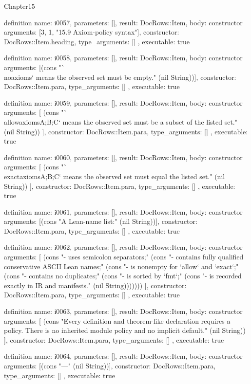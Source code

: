 \begin{lexlean}{Chapter15}
\begin{semanticmodule}
definition{
  name: i0057,
  parameters: [],
  result: DocRows::Item,
  body: constructor{
    arguments: [3, 1, "15.9 Axiom-policy syntax"],
    constructor: DocRows::Item.heading,
    type_arguments: []
  },
  executable: true
}

definition{
  name: i0058,
  parameters: [],
  result: DocRows::Item,
  body: constructor{
    arguments: [(cons "`\\noaxioms` means the observed set must be empty." (nil String))],
    constructor: DocRows::Item.para,
    type_arguments: []
  },
  executable: true
}

definition{
  name: i0059,
  parameters: [],
  result: DocRows::Item,
  body: constructor{
    arguments: [
      (cons "`\\allowaxioms{A;B;C}` means the observed set must be a subset of the listed set." (nil String))
    ],
    constructor: DocRows::Item.para,
    type_arguments: []
  },
  executable: true
}

definition{
  name: i0060,
  parameters: [],
  result: DocRows::Item,
  body: constructor{
    arguments: [
      (cons "`\\exactaxioms{A;B;C}` means the observed set must equal the listed set." (nil String))
    ],
    constructor: DocRows::Item.para,
    type_arguments: []
  },
  executable: true
}

definition{
  name: i0061,
  parameters: [],
  result: DocRows::Item,
  body: constructor{
    arguments: [(cons "A Lean-name list:" (nil String))],
    constructor: DocRows::Item.para,
    type_arguments: []
  },
  executable: true
}

definition{
  name: i0062,
  parameters: [],
  result: DocRows::Item,
  body: constructor{
    arguments: [
      (cons "- uses semicolon separators;" (cons "- contains fully qualified conservative ASCII Lean names;" (cons "- is nonempty for `allow` and `exact`;" (cons "- contains no duplicates;" (cons "- is sorted by `fmt`;" (cons "- is recorded exactly in IR and manifests." (nil String)))))))
    ],
    constructor: DocRows::Item.para,
    type_arguments: []
  },
  executable: true
}

definition{
  name: i0063,
  parameters: [],
  result: DocRows::Item,
  body: constructor{
    arguments: [
      (cons "Every definition and theorem-like declaration requires a policy. There is no inherited module policy and no implicit default." (nil String))
    ],
    constructor: DocRows::Item.para,
    type_arguments: []
  },
  executable: true
}

definition{
  name: i0064,
  parameters: [],
  result: DocRows::Item,
  body: constructor{
    arguments: [(cons "---" (nil String))],
    constructor: DocRows::Item.para,
    type_arguments: []
  },
  executable: true
}
\end{semanticmodule}
\end{lexlean}
